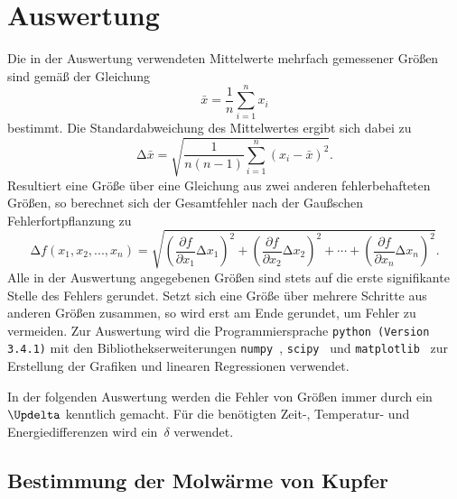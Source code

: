 ﻿\section{Auswertung}
\label{sec:auswertung}
%
Die in der Auswertung verwendeten Mittelwerte mehrfach gemessener Größen sind
gemäß der Gleichung
%
\begin{equation}
    \bar{x}=\frac{1}{n}\sum_{i=1}^n x_i
    \label{eq:mittelwert}
\end{equation}
%
bestimmt. Die Standardabweichung des Mittelwertes ergibt sich dabei zu
%
\begin{equation}
    \mathup{\Delta}\bar{x}=\sqrt{\frac{1}{n(n-1)}\sum_{i=1}^n\left(x_i-\bar{x}\right)^2}.
    \label{eq:standardabweichung}
\end{equation}
%
Resultiert eine Größe über eine Gleichung aus zwei anderen fehlerbehafteten
Größen, so berechnet sich der Gesamtfehler nach der Gaußschen
Fehlerfortpflanzung zu
%
\begin{equation}
    \mathup{\Delta}f(x_1,x_2,...,x_n)=\sqrt{\left(\frac{\partial f}{\partial x_1}\mathup{\Delta}x_1\right)^2+\left(\frac{\partial f}{\partial x_2}\mathup{\Delta}x_2\right)^2+ \dotsb +\left(\frac{\partial f}{\partial x_n}\mathup{\Delta}x_n\right)^2}.
    \label{eq:fehlerfortpflanzung}
\end{equation}
%
Alle in der Auswertung angegebenen Größen sind stets auf die erste signifikante
Stelle des Fehlers gerundet. Setzt sich eine Größe über mehrere Schritte aus
anderen Größen zusammen, so wird erst am Ende gerundet, um Fehler zu vermeiden.
Zur Auswertung wird die Programmiersprache \texttt{python (Version 3.4.1)} mit
den Bibliothekserweiterungen \texttt{numpy}~\cite{numpy},
\texttt{scipy}~\cite{scipy} und \texttt{matplotlib}~\cite{matplotlib} zur
Erstellung der Grafiken und linearen Regressionen verwendet.

In der folgenden Auswertung werden die Fehler von Größen immer durch
ein~$\Updelta$ kenntlich gemacht. Für die benötigten Zeit-, Temperatur- und
Energiedifferenzen wird ein~$\delta$ verwendet.
%
\subsection{Bestimmung der Molwärme von Kupfer}

